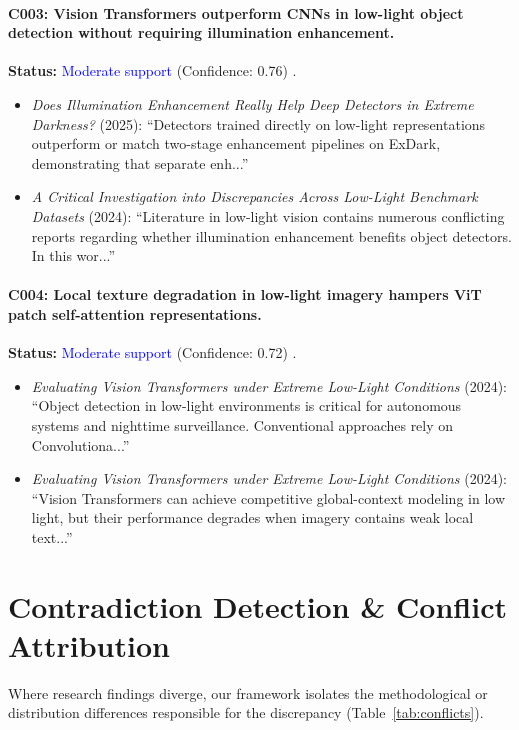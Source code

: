 \documentclass[11pt,a4paper]{article}
\begin{document}
\paragraph{C003: Vision Transformers outperform CNNs in low-light object detection without requiring illumination enhancement.}
\textbf{Status:} \textcolor{blue}{Moderate support} (Confidence: 0.76) \cite{paper_003}\cite{paper_005}\cite{paper_001}\cite{paper_001}\cite{paper_002}.
\begin{itemize}
    \item \textit{Does Illumination Enhancement Really Help Deep Detectors in Extreme Darkness?} (2025): ``Detectors trained directly on low-light representations outperform or match two-stage enhancement pipelines on ExDark, demonstrating that separate enh...'' \cite{paper_003}
    \item \textit{A Critical Investigation into Discrepancies Across Low-Light Benchmark Datasets} (2024): ``Literature in low-light vision contains numerous conflicting reports regarding whether illumination enhancement benefits object detectors. In this wor...'' \cite{paper_005}
\end{itemize}


\paragraph{C004: Local texture degradation in low-light imagery hampers ViT patch self-attention representations.}
\textbf{Status:} \textcolor{blue}{Moderate support} (Confidence: 0.72) \cite{paper_001}\cite{paper_001}\cite{paper_001}\cite{paper_001}.
\begin{itemize}
    \item \textit{Evaluating Vision Transformers under Extreme Low-Light Conditions} (2024): ``Object detection in low-light environments is critical for autonomous systems and nighttime surveillance. Conventional approaches rely on Convolutiona...'' \cite{paper_001}
    \item \textit{Evaluating Vision Transformers under Extreme Low-Light Conditions} (2024): ``Vision Transformers can achieve competitive global-context modeling in low light, but their performance degrades when imagery contains weak local text...'' \cite{paper_001}
\end{itemize}


\section{Contradiction Detection \& Conflict Attribution}
Where research findings diverge, our framework isolates the methodological or distribution differences responsible for the discrepancy (Table~\ref{tab:conflicts}).
\end{document}
